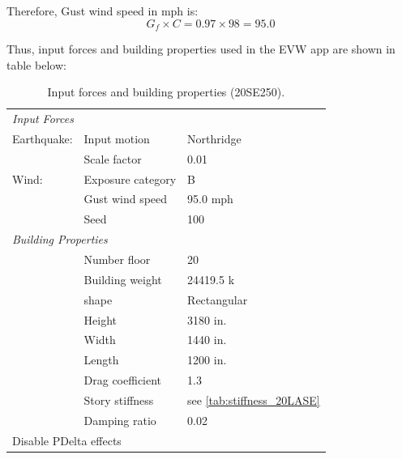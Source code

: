 \documentclass{simcenterdocumentation}
\begin{document}
Therefore, Gust wind speed in mph is:
\begin{equation*}
G_f \times C = 0.97 \times 98 = \boxed{95.0}
\end{equation*}

Thus, input forces and building properties used in the EVW app are shown in table below:

\begin{table}[H]
	\centering \caption{Input forces and building properties (20SE250).}
	\begin{tabular}{lll}
	\toprule
	\multicolumn{3}{l}{\textit{Input Forces}}					\\
	\cmidrule(rl){1-3}
	Earthquake:		& Input motion		& Northridge			\\
					& Scale factor		& 0.01					\\
	Wind:			& Exposure category	& B						\\
					& Gust wind speed	& 95.0 mph				\\
					& Seed				& 100					\\
	\midrule
	\multicolumn{3}{l}{\textit{Building Properties}}			\\
	\cmidrule(rl){1-3}
					& Number floor		& 20					\\
					& Building weight	& 24419.5 k				\\
					& shape				& Rectangular			\\
					& Height			& 3180 in.				\\
					& Width				& 1440 in.				\\
					& Length			& 1200 in.				\\
					& Drag coefficient	& 1.3					\\
					& Story stiffness	& see \cref{tab:stiffness_20LASE}			\\
					& Damping ratio		& 0.02					\\
	\midrule
	\multicolumn{3}{l}{Disable PDelta effects}					\\
	\bottomrule
	\end{tabular}
\end{table}
\end{document}

